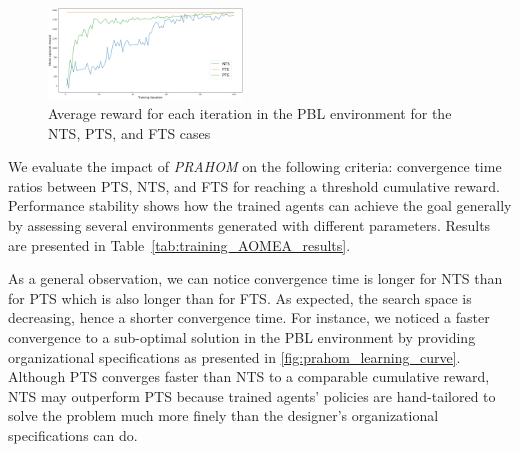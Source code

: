 \documentclass{ecai}
\begin{document}


\begin{figure}[h!]
    \centering
    \includegraphics[width=0.46\textwidth]{figures/prahom_learning_curve.png}
    \caption{Average reward for each iteration in the PBL environment for the NTS, PTS, and FTS cases}
    \label{fig:prahom_learning_curve}
\end{figure}
%
%
We evaluate the impact of \emph{PRAHOM} on the following criteria: convergence time ratios between PTS, NTS, and FTS for reaching a threshold cumulative reward. Performance stability shows how the trained agents can achieve the goal generally by assessing several environments generated with different parameters. Results are presented in Table~\ref{tab:training_AOMEA_results}.
%

%
As a general observation, we can notice convergence time is longer for NTS than for PTS which is also longer than for FTS. As expected, the search space is decreasing, hence a shorter convergence time. For instance, we noticed a faster convergence to a sub-optimal solution in the PBL environment by providing organizational specifications as presented in \autoref{fig:prahom_learning_curve}. Although PTS converges faster than NTS to a comparable cumulative reward, NTS may outperform PTS because trained agents' policies are hand-tailored to solve the problem much more finely than the designer's organizational specifications can do.
\end{document}
